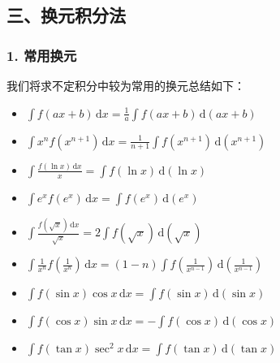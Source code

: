 \subsection{三、换元积分法}
\subsubsection{1. 常用换元}
我们将求不定积分中较为常用的换元总结如下：
\begin{itemize}
\item $\displaystyle{\int f(ax+b)\,\mathrm{d}x=\frac{1}{a}\int f(ax+b)\,\mathrm{d}\left(ax+b\right)}$
\end{itemize}
\begin{itemize}
\item $\displaystyle{\int x^nf(x^{n+1})\,\mathrm{d}x=\frac{1}{n+1}\int f(x^{n+1})\,\mathrm{d}(x^{n+1})}$
\end{itemize} 
\begin{itemize}
\item $\displaystyle{\int \frac{f(\ln x)\,\mathrm{d}x}{x}=\int f(\ln x)\,\mathrm{d}(\ln x)}$ 
\end{itemize}
\begin{itemize}
\item $\displaystyle{\int e^xf(e^x)\,\mathrm{d}x=\int f(e^x)\,\mathrm{d}(e^x)}$ 
\end{itemize}
\begin{itemize}
\item $\displaystyle{\int \frac{f(\sqrt{x})\,\mathrm{d}x}{\sqrt{x}}=2\int f(\sqrt{x})\,\mathrm{d}(\sqrt{x})}$
\end{itemize} 
\begin{itemize}
\item $\displaystyle{\int \frac{1}{x^n}f\left(\frac{1}{x^n}\right)\,\mathrm{d}x=(1-n)\int f\left(\frac{1}{x^{n-1}}\right)\,\mathrm{d}\left(\frac{1}{x^{n-1}}\right)}$ 
\end{itemize}
\begin{itemize}
\item $\displaystyle{\int f(\sin x)\cos x\,\mathrm{d}x=\int f(\sin x)\,\mathrm{d}(\sin x)}$ 
\end{itemize}
\begin{itemize}
\item $\displaystyle{\int f(\cos x)\sin x\,\mathrm{d}x=-\int f(\cos x)\,\mathrm{d}(\cos x)}$
\end{itemize} 
\begin{itemize}
\item $\displaystyle{\int f(\tan x)\sec^2x\,\mathrm{d}x=\int f(\tan x)\,\mathrm{d}(\tan x)}$
\end{itemize} 
